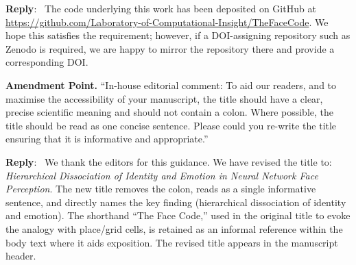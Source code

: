 \documentclass[11pt]{article}
\newenvironment{reply}
   {\medskip \noindent \color{blue} \begin{sf}\textbf{Reply}:\  }
   {\medskip \par \end{sf}}
\begin{document}
\begin{reply}
The code underlying this work has been deposited on GitHub at \url{https://github.com/Laboratory-of-Computational-Insight/TheFaceCode}. We hope this satisfies the requirement; however, if a DOI-assigning repository such as Zenodo is required, we are happy to mirror the repository there and provide a corresponding DOI.
\end{reply}

\bigskip
\noindent \textbf{Amendment Point.} ``In-house editorial comment: To aid our readers, and to maximise the accessibility of your manuscript, the title should have a clear, precise scientific meaning and should not contain a colon. Where possible, the title should be read as one concise sentence. Please could you re-write the title ensuring that it is informative and appropriate.''

\begin{reply}
We thank the editors for this guidance. We have revised the title to: \textit{Hierarchical Dissociation of Identity and Emotion in Neural Network Face Perception}. The new title removes the colon, reads as a single informative sentence, and directly names the key finding (hierarchical dissociation of identity and emotion). The shorthand ``The Face Code,'' used in the original title to evoke the analogy with place/grid cells, is retained as an informal reference within the body text where it aids exposition. The revised title appears in the manuscript header.
\end{reply}

%
%
\end{document}
